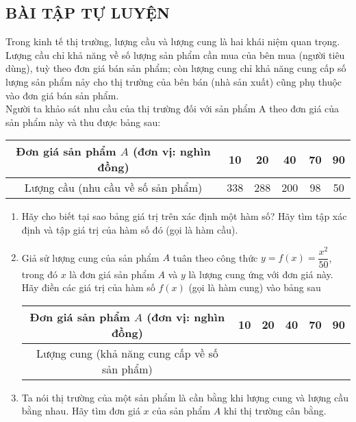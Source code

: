 \subsection{BÀI TẬP TỰ LUYỆN}

\begin{bt}%
	Trong kinh tế thị trường, lượng cầu và lượng cung là hai khái niệm quan trọng. Lượng cầu chỉ khả năng về số lượng sản phẩm cần mua của bên mua (người tiêu dùng), tuỳ theo đơn giá bán sản phẩm; còn lượng cung chỉ khả năng cung cấp số lượng sản phẩm nảy cho thị trường của bên bán (nhà sản xuất) cũng phụ thuộc vào đơn giá bán sản phẩm.\\
	Người ta khảo sát nhu cầu của thị trường đối với sản phẩm $\mathrm{A}$ theo đơn giá của sản phẩm này và thu được bảng sau:
	\begin{center}
		\begin{tabular}{|c|c|c|c|c|c|}
			\hline Đơn giá sản phẩm $A$ (đơn vị: nghìn đồng) & 10 & 20 & 40 & 70 & 90 \\
			\hline Lượng cầu (nhu cầu về số sản phẩm) & 338 & 288 & 200 & 98 & 50 \\
			\hline
		\end{tabular}
	\end{center}
	\begin{enumerate}
		\item Hãy cho biết tại sao bảng giá trị trên xác định một hàm số? Hãy tìm tập xác định và tập giá trị của hàm số đó (gọi là hàm cầu).
		\item Giả sử lượng cung của sản phẩm $A$ tuân theo công thức $y=f(x)=\dfrac{x^{2}}{50}$, trong đó $x$ là đơn giá sản phẩm $A$ và $y$ là lượng cung ứng với đơn giá này. Hãy điền các giá trị của hàm số $f(x)$ (gọi là hàm cung) vào bảng sau
		\begin{center}
			\begin{tabular}{|c|l|l|l|l|l|}
				\hline Đơn giá sản phẩm $A$ (đơn vị: nghìn đồng) & 10 & 20 & 40 & 70 & 90 \\
				\hline Lượng cung (khả năng cung cấp về số sản phẩm) & & & & & \\
				\hline
			\end{tabular}
		\end{center}
		\item Ta nói thị trường của một sản phẩm là cần bằng khi lượng cung và lượng cầu bằng nhau. Hãy tìm đơn giá $x$ của sản phẩm $A$ khi thị trường cân bằng.
	\end{enumerate}
	\loigiai{
		\begin{enumerate}

\end{enumerate}}
\end{bt}
